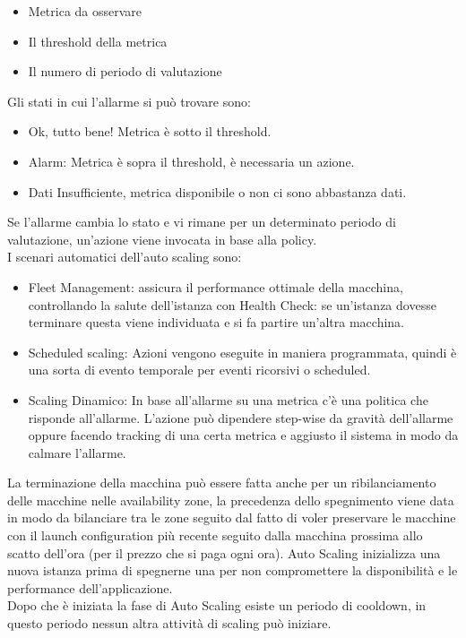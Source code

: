 \documentclass[11pt, twocolumn]{article}
\newenvironment{myitemize}
{ \begin{itemize}[topsep=0ex]
		\setlength{\itemsep}{0pt}
		\setlength{\parskip}{0pt}
		\setlength{\parsep}{0pt}     }
	{ \end{itemize}                  }
\begin{document}
\begin{myitemize}
	\item Metrica da osservare
	\item Il threshold della metrica
	\item Il numero di periodo di valutazione
\end{myitemize}
Gli stati in cui l'allarme si può trovare sono:
\begin{myitemize}
	\item Ok, tutto bene! Metrica è sotto il threshold.
	\item Alarm: Metrica è sopra il threshold, è necessaria un azione.
	\item Dati Insufficiente, metrica disponibile o non ci sono abbastanza dati.
\end{myitemize}
Se l'allarme cambia lo stato e vi rimane per un determinato periodo di valutazione, un'azione viene invocata in base alla policy.\\
I scenari automatici dell'auto scaling sono:
\begin{myitemize}
	\item Fleet Management: assicura il performance ottimale della macchina, controllando la salute dell'istanza con Health Check: se un'istanza dovesse terminare questa viene individuata e si fa partire un'altra macchina.
	\item Scheduled scaling: Azioni vengono eseguite in maniera programmata, quindi è una sorta di evento temporale per eventi ricorsivi o scheduled.
	\item Scaling Dinamico: In base all'allarme su una metrica c'è una politica che risponde all'allarme. L'azione può dipendere step-wise da gravità dell'allarme oppure facendo tracking di una certa metrica e aggiusto il sistema in modo da calmare l'allarme.
\end{myitemize}
La terminazione della macchina può essere fatta anche per un ribilanciamento delle macchine nelle availability zone, la precedenza dello spegnimento viene data in modo da bilanciare tra le zone seguito dal fatto di voler preservare le macchine con il launch configuration più recente seguito dalla macchina prossima allo scatto dell'ora (per il prezzo che si paga ogni ora).
Auto Scaling inizializza una nuova istanza prima di spegnerne una per non compromettere la disponibilità e le performance dell'applicazione.\\
Dopo che è iniziata la fase di Auto Scaling esiste un periodo di cooldown, in questo periodo nessun altra attività di scaling può iniziare.\\
\end{document}
